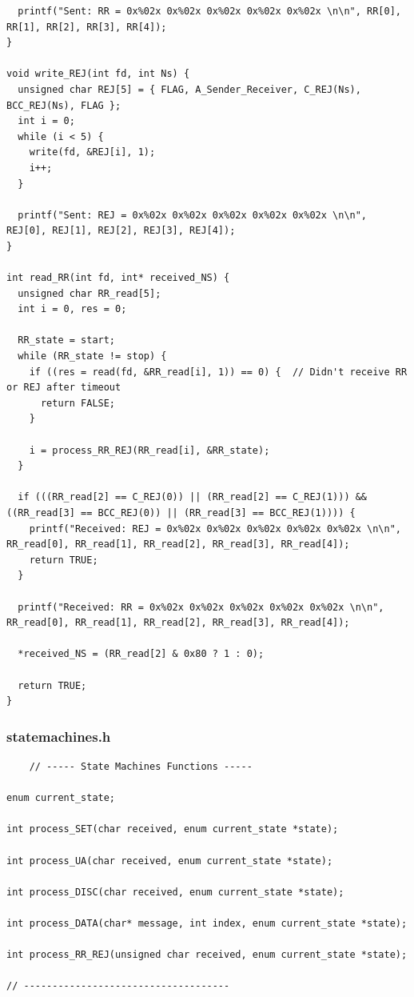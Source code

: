 \documentclass[article, a4paper, 11pt, oneside]{memoir}
\begin{document}
\begin{lstlisting}
  printf("Sent: RR = 0x%02x 0x%02x 0x%02x 0x%02x 0x%02x \n\n", RR[0], RR[1], RR[2], RR[3], RR[4]);
}

void write_REJ(int fd, int Ns) {
  unsigned char REJ[5] = { FLAG, A_Sender_Receiver, C_REJ(Ns), BCC_REJ(Ns), FLAG };
  int i = 0;
  while (i < 5) {
    write(fd, &REJ[i], 1);
    i++;
  }

  printf("Sent: REJ = 0x%02x 0x%02x 0x%02x 0x%02x 0x%02x \n\n", REJ[0], REJ[1], REJ[2], REJ[3], REJ[4]);
}

int read_RR(int fd, int* received_NS) {
  unsigned char RR_read[5];
  int i = 0, res = 0;

  RR_state = start;
  while (RR_state != stop) {
    if ((res = read(fd, &RR_read[i], 1)) == 0) {  // Didn't receive RR or REJ after timeout
      return FALSE;
    }

    i = process_RR_REJ(RR_read[i], &RR_state);
  }

  if (((RR_read[2] == C_REJ(0)) || (RR_read[2] == C_REJ(1))) && ((RR_read[3] == BCC_REJ(0)) || (RR_read[3] == BCC_REJ(1)))) {
    printf("Received: REJ = 0x%02x 0x%02x 0x%02x 0x%02x 0x%02x \n\n", RR_read[0], RR_read[1], RR_read[2], RR_read[3], RR_read[4]);
    return TRUE;
  }

  printf("Received: RR = 0x%02x 0x%02x 0x%02x 0x%02x 0x%02x \n\n", RR_read[0], RR_read[1], RR_read[2], RR_read[3], RR_read[4]);

  *received_NS = (RR_read[2] & 0x80 ? 1 : 0);

  return TRUE;
}
\end{lstlisting}

\newpage
\subsubsection{state\textunderscore machines.h}
\begin{lstlisting}
	// ----- State Machines Functions -----

enum current_state;

int process_SET(char received, enum current_state *state);

int process_UA(char received, enum current_state *state);

int process_DISC(char received, enum current_state *state);

int process_DATA(char* message, int index, enum current_state *state);

int process_RR_REJ(unsigned char received, enum current_state *state);

// ------------------------------------
\end{lstlisting}
\end{document}
